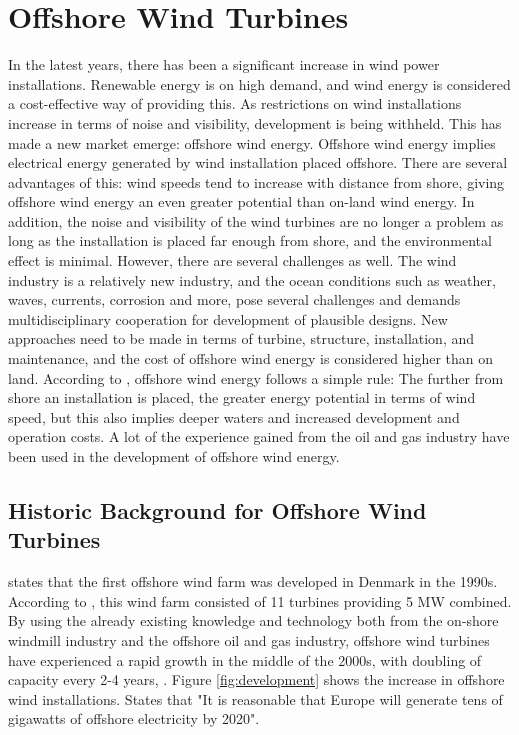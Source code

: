 \section{Offshore Wind Turbines}
In the latest years, there has been a significant increase in wind power installations. Renewable energy is on high demand, and wind energy is considered a cost-effective way of providing this. As restrictions on wind installations increase in terms of noise and visibility, development is being withheld. This has made a new market emerge: offshore wind energy. Offshore wind energy implies electrical energy generated by wind installation placed offshore.  There are several advantages of this: wind speeds tend to increase with distance from shore, giving offshore wind energy an even greater potential than on-land wind energy. In addition, the noise and visibility of the wind turbines are no longer a problem as long as the installation is placed far enough from shore, and the environmental effect is minimal. However, there are several challenges as well. The wind industry is a relatively new industry, and the ocean conditions such as weather, waves, currents, corrosion and more, pose several challenges and demands multidisciplinary cooperation for development of plausible designs. New approaches need to be made in terms of turbine, structure, installation, and maintenance, and the cost of offshore wind energy is considered higher than on land. According to \cite{Kapsali2012}, offshore wind energy follows a simple rule: The further from shore an installation is placed, the greater energy potential in terms of wind speed, but this also implies deeper waters and increased development and operation costs. A lot of the experience gained from the oil and gas industry have been used in the development of offshore wind energy. 

\subsection{Historic Background for Offshore Wind Turbines}
\cite{NG2016} states that the first offshore wind farm was developed in Denmark in the 1990s. According to \cite{Lynn2011}, this wind farm consisted of 11 turbines providing 5 MW combined.  By using the already existing knowledge and technology both from the on-shore windmill industry and the offshore oil and gas industry, offshore wind turbines have experienced a rapid growth in the middle of the 2000s, with doubling of capacity every 2-4 years, \cite{NG2016}. Figure \ref{fig:development} shows the increase in offshore wind installations. \cite{Lynn2011} States that "It is reasonable that Europe will generate tens of gigawatts of offshore electricity by 2020".


